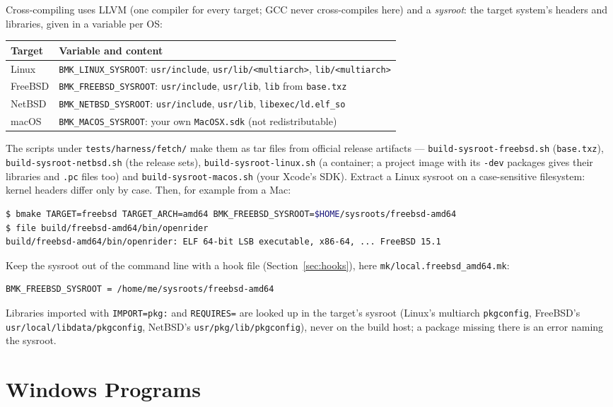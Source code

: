 \documentclass[11pt]{report}
\begin{document}
Cross-compiling uses LLVM (one compiler for every target; GCC never
cross-compiles here) and a \emph{sysroot}: the target system's headers
and libraries, given in a variable per OS:
\begin{center}
\begin{tabular}{ll}
\toprule
Target & Variable and content \\
\midrule
Linux & \verb|BMK_LINUX_SYSROOT|: \verb|usr/include|, \verb|usr/lib/<multiarch>|, \verb|lib/<multiarch>| \\
FreeBSD & \verb|BMK_FREEBSD_SYSROOT|: \verb|usr/include|, \verb|usr/lib|, \verb|lib| from \verb|base.txz| \\
NetBSD & \verb|BMK_NETBSD_SYSROOT|: \verb|usr/include|, \verb|usr/lib|, \verb|libexec/ld.elf_so| \\
macOS & \verb|BMK_MACOS_SYSROOT|: your own \verb|MacOSX.sdk| (not redistributable) \\
\bottomrule
\end{tabular}
\end{center}
The scripts under \verb|tests/harness/fetch/| make them as tar files
from official release artifacts --- \verb|build-sysroot-freebsd.sh|
(\verb|base.txz|), \verb|build-sysroot-netbsd.sh| (the release sets),
\verb|build-sysroot-linux.sh| (a container; a project image with its
\verb|-dev| packages gives their libraries and \verb|.pc| files too) and
\verb|build-sysroot-macos.sh| (your Xcode's SDK). Extract a Linux
sysroot on a case-sensitive filesystem: kernel headers differ only by
case. Then, for example from a Mac:
\begin{lstlisting}[language=bash]
$ bmake TARGET=freebsd TARGET_ARCH=amd64 BMK_FREEBSD_SYSROOT=$HOME/sysroots/freebsd-amd64
$ file build/freebsd-amd64/bin/openrider
build/freebsd-amd64/bin/openrider: ELF 64-bit LSB executable, x86-64, ... FreeBSD 15.1
\end{lstlisting}
Keep the sysroot out of the command line with a hook file
(Section~\ref{sec:hooks}), here \verb|mk/local.freebsd_amd64.mk|:
\begin{lstlisting}[language=bmake]
BMK_FREEBSD_SYSROOT = /home/me/sysroots/freebsd-amd64
\end{lstlisting}
Libraries imported with \verb|IMPORT=pkg:| and \verb|REQUIRES=| are
looked up in the target's sysroot (Linux's multiarch
\verb|pkgconfig|, FreeBSD's \verb|usr/local/libdata/pkgconfig|,
NetBSD's \verb|usr/pkg/lib/pkgconfig|), never on the build host; a
package missing there is an error naming the sysroot.

\section{Windows Programs}
\end{document}

